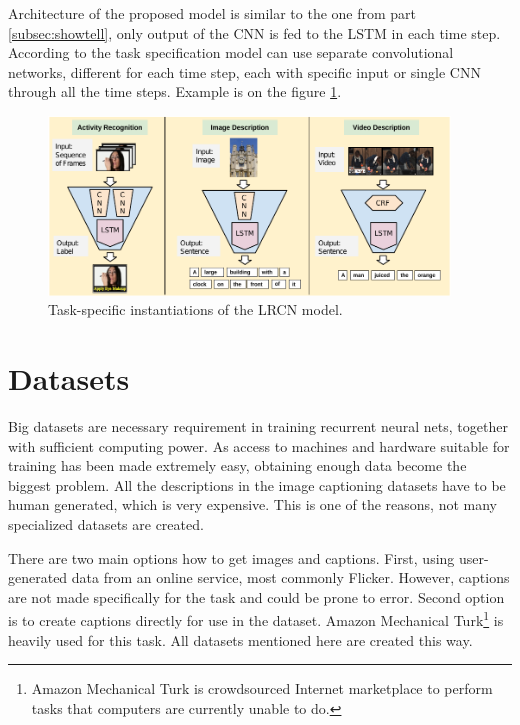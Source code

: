 Architecture of the proposed model is similar to the one from part \ref{subsec:showtell}, only output of the CNN is fed to the LSTM in each time step. According to the task specification model can use separate convolutional networks, different for each time step, each with specific input or single CNN through all the time steps. Example is on the figure \ref{fig:LRCN}.

\begin{figure}[!t]
	\centering
	\includegraphics[width=0.95\textwidth]{./fig/long-term-rec-con.pdf}
	\caption{Task-specific instantiations of the LRCN model.~\cite{DBLP:journals/corr/DonahueHGRVSD14}
		\label{fig:LRCN}}
\end{figure}

\section{Datasets}\label{sec:datasets}

Big datasets are necessary requirement in training recurrent neural nets, together with sufficient computing power. As access to machines and hardware suitable for training has been made extremely easy, obtaining enough data become the biggest problem. All the descriptions in the image captioning datasets have to be human generated, which is very expensive. This is one of the reasons, not many specialized datasets are created.

There are two main options how to get images and captions. First, using user-generated data from an online service, most commonly Flicker. However, captions are not made specifically for the task and could be prone to error. Second option is to create captions directly for use in the dataset. Amazon Mechanical Turk\footnote{Amazon Mechanical Turk is crowdsourced Internet marketplace to perform tasks that computers are currently unable to do.} is heavily used for this task. All datasets mentioned here are created this way.

